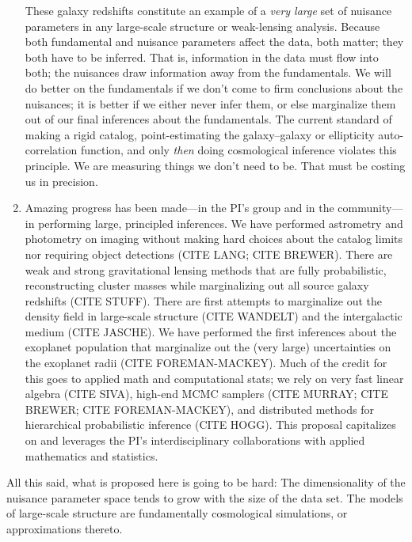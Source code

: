 \documentclass[12pt]{article}
\begin{document}
\begin{enumerate}
These galaxy redshifts constitute an example of a \emph{very large}
set of nuisance parameters in any large-scale structure or
weak-lensing analysis.
Because both fundamental and nuisance parameters affect the data, both
matter; they both have to be inferred.
That is, information in the data must flow into both; the nuisances
draw information away from the fundamentals.
We will do better on the fundamentals if we don't come to firm
conclusions about the nuisances; it is better if we either never infer
them, or else marginalize them out of our final inferences about the
fundamentals.
The current standard of making a rigid catalog, point-estimating the
galaxy--galaxy or ellipticity auto-correlation function, and only
\emph{then} doing cosmological inference violates this principle.
We are measuring things we don't need to be.
That must be costing us in precision.
\item
Amazing progress has been made---in the PI's group and in the
community---in performing large, principled inferences.
We have performed astrometry and photometry on imaging without making
hard choices about the catalog limits nor requiring object detections
(CITE LANG; CITE BREWER).
There are weak and strong gravitational lensing methods that are fully
probabilistic, reconstructing cluster masses while marginalizing out
all source galaxy redshifts (CITE STUFF).
There are first attempts to marginalize out the density field in
large-scale structure (CITE WANDELT) and the intergalactic medium
(CITE JASCHE).
We have performed the first inferences about the exoplanet population
that marginalize out the (very large) uncertainties on the exoplanet
radii (CITE FOREMAN-MACKEY).
Much of the credit for this goes to applied math and computational
stats; we rely on very fast linear algebra (CITE SIVA), high-end MCMC
samplers (CITE MURRAY; CITE BREWER; CITE FOREMAN-MACKEY), and distributed methods
for hierarchical probabilistic inference (CITE HOGG).
This proposal capitalizes on and leverages the PI's interdisciplinary
collaborations with applied mathematics and statistics.
\end{enumerate}

All this said, what is proposed here is going to be hard:
The dimensionality of the nuisance parameter space tends to grow with
the size of the data set.
The models of large-scale structure are fundamentally cosmological
simulations, or approximations thereto.
\end{document}
